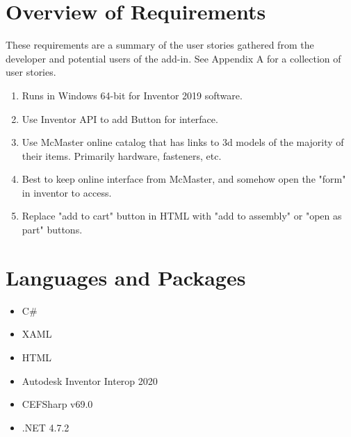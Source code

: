 \documentclass[12pt, letterpaper]{article}
\begin{document}
\section{Overview of Requirements}
These requirements are a summary of the user stories gathered from the developer and potential users of the add-in. See Appendix A
for a collection of user stories.
\begin{enumerate}
\item Runs in Windows 64-bit for Inventor 2019 software.
\item Use Inventor API to add Button for interface.
\item Use McMaster online catalog that has links to 3d models of the majority of their items. Primarily hardware, fasteners, etc.
\item Best to keep online interface from McMaster, and somehow open the "form" in inventor to access.
\item Replace "add to cart" button in HTML with "add to assembly" or "open as part" buttons.
\end{enumerate}
\newpage
\section{Languages and Packages}
\begin{multicols}{2}

\begin{itemize}
    \item C\#
    \item XAML
    \item HTML
    \item Autodesk Inventor Interop 2020
    \item CEFSharp v69.0 \cite{CEFSharp}
    \item .NET 4.7.2 \cite{NET}
\end{itemize}
\end{multicols}
\end{document}
